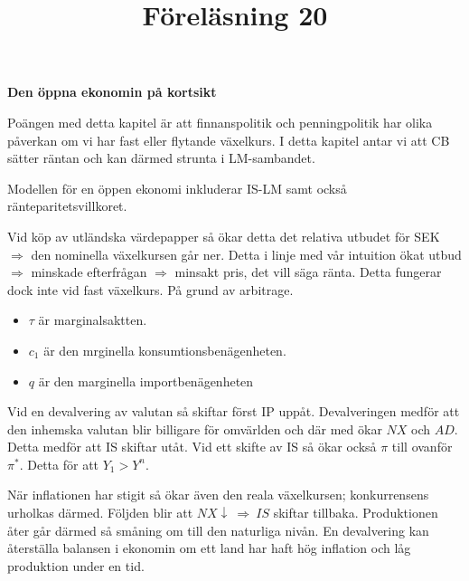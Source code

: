 \documentclass{article}
\begin{document}
\vspace{5mm} \par \noindent 
\title{Föreläsning 20}
\vspace{5mm} \par \noindent 
\textbf{Den öppna ekonomin på kortsikt}
\vspace{5mm} \par \noindent 
Poängen med detta kapitel är att finnanspolitik och penningpolitik har olika påverkan om vi har fast eller flytande växelkurs. I detta kapitel antar vi att CB sätter räntan och kan därmed strunta i LM-sambandet. 
\vspace{5mm} \par \noindent 

Modellen för en öppen ekonomi inkluderar IS-LM samt också ränteparitetsvillkoret. 
\vspace{5mm} \par \noindent 
Vid köp av utländska värdepapper så ökar detta det relativa utbudet för SEK $ \Rightarrow $ den nominella växelkursen går ner. Detta i linje med vår intuition ökat utbud $ \Rightarrow $ minskade efterfrågan $ \Rightarrow $ minsakt pris, det vill säga ränta. Detta fungerar dock inte vid fast växelkurs. På grund av arbitrage. 


\begin{itemize}
     \item $ \tau $ är marginalsaktten.
     \item $ c_1 $ är den mrginella konsumtionsbenägenheten. 
     \item $ q $ är den marginella importbenägenheten
\end{itemize}

Vid en devalvering av valutan så skiftar först IP uppåt. Devalveringen medför att den inhemska valutan blir billigare för omvärlden och där med ökar $ NX $ och $ AD $. Detta medför att IS skiftar utåt. Vid ett skifte av IS så ökar också $ \pi $ till ovanför $ \pi^*$. Detta för att $ Y_1 > Y^n$. 

\vspace{5mm} \par \noindent 

När inflationen har stigit så ökar även den reala växelkursen; konkurrensens urholkas därmed. Följden blir att $ NX \downarrow \ \Rightarrow \ IS $ skiftar tillbaka. Produktionen åter går därmed så småning om till den naturliga nivån. En devalvering kan återställa balansen i ekonomin om ett land har haft hög inflation och låg produktion under en tid. 
\end{document}
